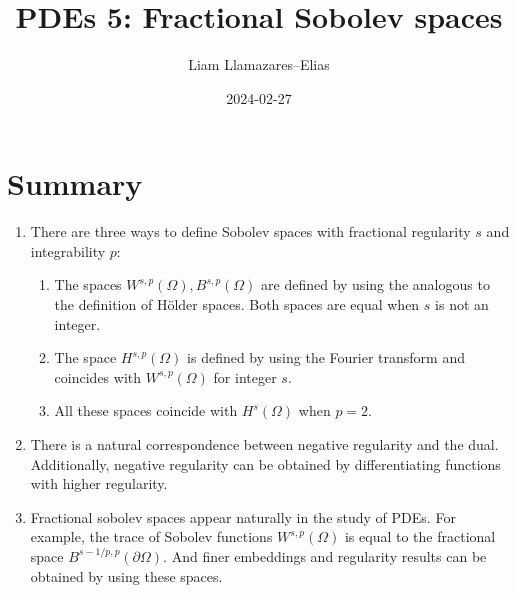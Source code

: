 \documentclass[
    a4paper,
    DIV=14,
    abstract=true,
    numbers=noenddot
]{scrartcl}
\begin{document}
\title{PDEs 5: Fractional Sobolev spaces}
\author{Liam Llamazares--Elias}
\date{2024-02-27}
\maketitle
\section{Summary}
\begin{enumerate}
    \item There are three ways to define Sobolev spaces with fractional regularity $s$ and integrability $p$:
          \begin{enumerate}
              \item The spaces $W^{s,p}(\Omega ), B^{s,p}(\Omega )$  are defined by using the analogous to the definition of H\"older spaces. Both spaces are equal when  $s$ is not an integer.

              \item  The space $H^{s,p}(\Omega )$ is defined by using the Fourier transform and coincides with $W^{s,p}(\Omega )$ for integer $s$.
              \item All these spaces coincide with $H^s(\Omega )$  when $p=2$.
          \end{enumerate}
    \item There is a natural correspondence between negative regularity and the dual. Additionally, negative regularity can be obtained by differentiating functions with higher regularity.
    \item Fractional sobolev spaces appear naturally in the study of PDEs. For example, the trace of Sobolev functions $W^{s,p}(\Omega)$ is equal to the fractional space $B^{s-1/p,p}(\partial \Omega)$. And finer embeddings and regularity results can be obtained by using these spaces.
\end{enumerate}
\end{document}
